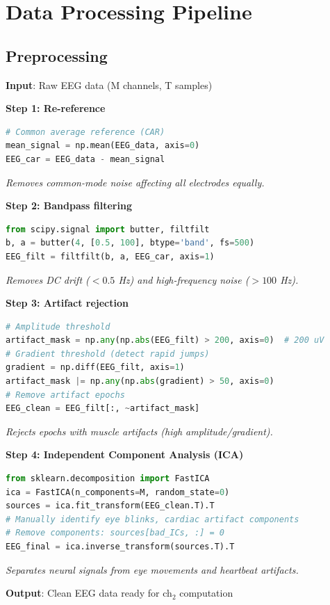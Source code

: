 \section{Data Processing Pipeline}

\subsection{Preprocessing}

\begin{algorithm}[H]\caption{Preprocessing Steps}\label{alg:preprocess}
\textbf{Input}: Raw EEG data (M channels, T samples)

\textbf{Step 1: Re-reference}
\begin{lstlisting}[language=Python, basicstyle=\ttfamily\small]
# Common average reference (CAR)
mean_signal = np.mean(EEG_data, axis=0)
EEG_car = EEG_data - mean_signal
\end{lstlisting}
\textit{Removes common-mode noise affecting all electrodes equally.}

\textbf{Step 2: Bandpass filtering}
\begin{lstlisting}[language=Python]
from scipy.signal import butter, filtfilt
b, a = butter(4, [0.5, 100], btype='band', fs=500)
EEG_filt = filtfilt(b, a, EEG_car, axis=1)
\end{lstlisting}
\textit{Removes DC drift ($< 0.5$ Hz) and high-frequency noise ($> 100$ Hz).}

\textbf{Step 3: Artifact rejection}
\begin{lstlisting}[language=Python]
# Amplitude threshold
artifact_mask = np.any(np.abs(EEG_filt) > 200, axis=0)  # 200 uV
# Gradient threshold (detect rapid jumps)
gradient = np.diff(EEG_filt, axis=1)
artifact_mask |= np.any(np.abs(gradient) > 50, axis=0)
# Remove artifact epochs
EEG_clean = EEG_filt[:, ~artifact_mask]
\end{lstlisting}
\textit{Rejects epochs with muscle artifacts (high amplitude/gradient).}

\textbf{Step 4: Independent Component Analysis (ICA)}
\begin{lstlisting}[language=Python]
from sklearn.decomposition import FastICA
ica = FastICA(n_components=M, random_state=0)
sources = ica.fit_transform(EEG_clean.T).T
# Manually identify eye blinks, cardiac artifact components
# Remove components: sources[bad_ICs, :] = 0
EEG_final = ica.inverse_transform(sources.T).T
\end{lstlisting}
\textit{Separates neural signals from eye movements and heartbeat artifacts.}

\textbf{Output}: Clean EEG data ready for ch$_2$ computation
\end{algorithm}

